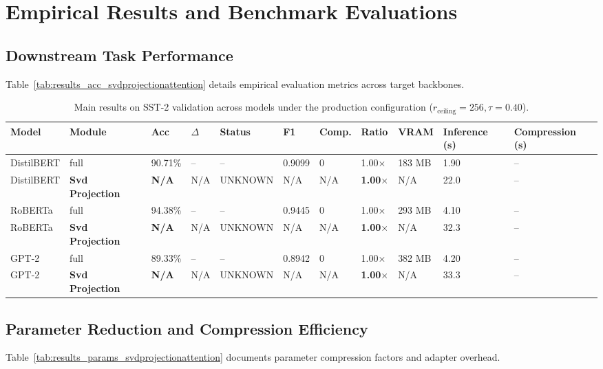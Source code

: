 \section{Empirical Results and Benchmark Evaluations}

\subsection{Downstream Task Performance}
Table~\ref{tab:results_acc_svdprojectionattention} details empirical evaluation metrics across target backbones.

\begin{table}[t]
\centering
\small
\begin{tabular}{lllllllllll}
\toprule
\textbf{Model} & \textbf{Module} & \textbf{Acc} & \textbf{$\Delta$} & \textbf{Status} & \textbf{F1} & \textbf{Comp.} & \textbf{Ratio} & \textbf{VRAM} & \textbf{Inference (s)} & \textbf{Compression (s)} \\
\midrule
DistilBERT & full & 90.71\% & -- & -- & 0.9099 & 0 & 1.00$\times$ & 183 MB & 1.90 & -- \\
DistilBERT & \textbf{Svd Projection} & \textbf{N/A} & N/A & UNKNOWN & N/A & N/A & \textbf{1.00$\times$} & N/A & 22.0 & -- \\
RoBERTa & full & 94.38\% & -- & -- & 0.9445 & 0 & 1.00$\times$ & 293 MB & 4.10 & -- \\
RoBERTa & \textbf{Svd Projection} & \textbf{N/A} & N/A & UNKNOWN & N/A & N/A & \textbf{1.00$\times$} & N/A & 32.3 & -- \\
GPT-2 & full & 89.33\% & -- & -- & 0.8942 & 0 & 1.00$\times$ & 382 MB & 4.20 & -- \\
GPT-2 & \textbf{Svd Projection} & \textbf{N/A} & N/A & UNKNOWN & N/A & N/A & \textbf{1.00$\times$} & N/A & 33.3 & -- \\
\bottomrule
\end{tabular}
\caption{Main results on SST-2 validation across models under the production configuration ($r_{\mathrm{ceiling}}=256, \tau=0.40$).}
\label{tab:main_sst2}
\end{table}

\subsection{Parameter Reduction and Compression Efficiency}
Table~\ref{tab:results_params_svdprojectionattention} documents parameter compression factors and adapter overhead.

